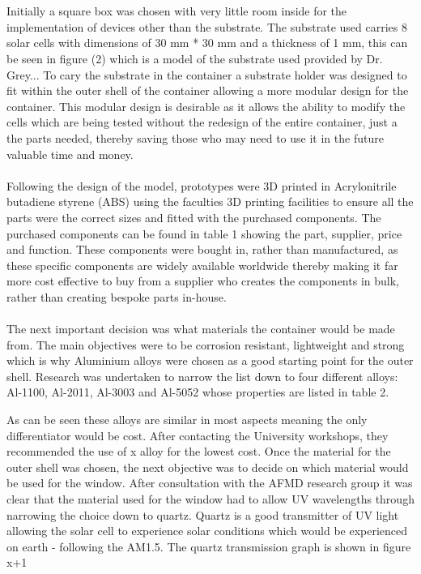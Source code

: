 \documentclass[a4paper,11pt]{article}
\begin{document}
\\
\\
Initially a square box was chosen with very little room inside for the implementation of devices other than the substrate. The substrate used carries 8 solar cells with dimensions of 30 mm * 30 mm and a thickness of 1 mm, this can be seen in figure (2) which is a model of the substrate used provided by Dr. Grey... To cary the substrate in the container a substrate holder was designed to fit within the outer shell of the container allowing a more modular design for the container. This modular design is desirable as it allows the ability to modify the cells which are being tested without the redesign of the entire container, just a the parts needed, thereby saving those who may need to use it in the future valuable time and money. 
\\
\\
Following the design of the model, prototypes were 3D printed in Acrylonitrile butadiene styrene (ABS) using the faculties 3D printing facilities to ensure all the parts were the correct sizes and fitted with the purchased components. The purchased components can be found in table 1 showing the part, supplier, price and function. These components were bought in, rather than manufactured, as these specific components are widely available worldwide thereby making it far more cost effective to buy from a supplier who creates the components in bulk, rather than creating bespoke parts in-house. 
\\
\\
The next important decision was what materials the container would be made from. The main objectives were to be corrosion resistant, lightweight and strong which is why Aluminium alloys were chosen as a good starting point for the outer shell. Research was undertaken to narrow the list down to four different alloys: Al-1100, Al-2011, Al-3003 and Al-5052 whose properties are listed in table 2.


As can be seen these alloys are similar in most aspects meaning the only differentiator would be cost. After contacting the University workshops, they recommended the use of x alloy for the lowest cost. Once the material for the outer shell was chosen, the next objective was to decide on which material would be used for the window. After consultation with the AFMD research group it was clear that the material used for the window had to allow UV wavelengths through narrowing the choice down to quartz. Quartz is a good transmitter of UV light allowing the solar cell to experience solar conditions which would be experienced on earth - following the AM1.5. The quartz transmission graph is shown in figure x+1 
\end{document}
